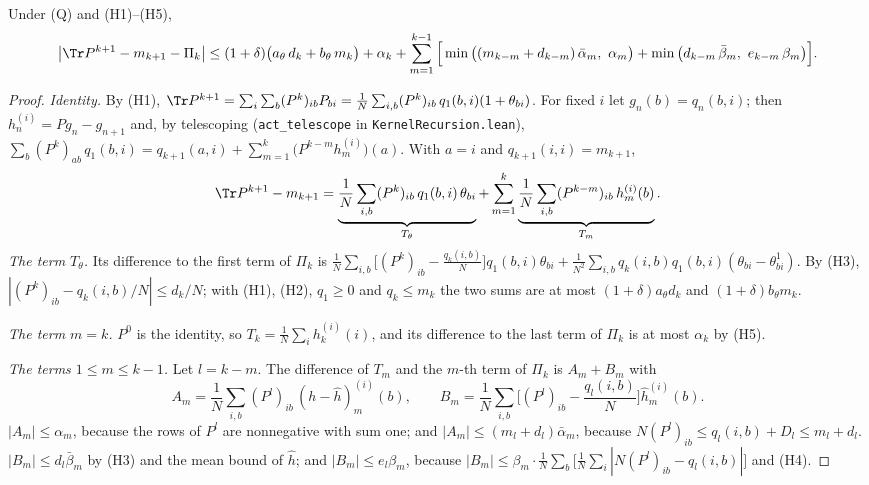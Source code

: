 \begin{lemma}\label{lem:reduction-abstract}
Under \textup{(Q)} and \textup{(H1)}--\textup{(H5)},
\[
 \big|\Tr P^{k+1}-m_{k+1}-\Pi_k\big|\le(1+\delta)\big(a_\theta\,d_k+b_\theta\,m_k\big)+\alpha_k
 +\sum_{m=1}^{k-1}\Big[\min\big((m_{k-m}+d_{k-m})\,\bar\alpha_m,\ \alpha_m\big)
 +\min\big(d_{k-m}\,\bar\beta_m,\ e_{k-m}\,\beta_m\big)\Big].
\]
\end{lemma}

\begin{proof}
\emph{Identity.} By (H1), $\Tr P^{k+1}=\sum_i\sum_b(P^k)_{ib}P_{bi}=\frac1N\sum_{i,b}(P^k)_{ib}\,q_1(b,i)(1+\theta_{bi})$.
For fixed $i$ let $g_n(b)=q_n(b,i)$; then $h^{(i)}_n=Pg_n-g_{n+1}$ and, by telescoping
(\texttt{act\_telescope} in \texttt{KernelRecursion.lean}),
$\sum_b(P^k)_{ab}\,q_1(b,i)=q_{k+1}(a,i)+\sum_{m=1}^k\big(P^{k-m}h^{(i)}_m\big)(a)$. With $a=i$ and
$q_{k+1}(i,i)=m_{k+1}$,
\[
 \Tr P^{k+1}-m_{k+1}=\underbrace{\frac1N\sum_{i,b}(P^k)_{ib}\,q_1(b,i)\,\theta_{bi}}_{T_\theta}
 +\sum_{m=1}^{k}\underbrace{\frac1N\sum_{i,b}(P^{k-m})_{ib}\,h^{(i)}_m(b)}_{T_m} .
\]
\emph{The term $T_\theta$.} Its difference to the first term of $\Pi_k$ is
$\frac1N\sum_{i,b}\big[(P^k)_{ib}-\frac{q_k(i,b)}N\big]q_1(b,i)\theta_{bi}+\frac1{N^2}\sum_{i,b}q_k(i,b)q_1(b,i)(\theta_{bi}-\theta^1_{bi})$.
By (H3), $|(P^k)_{ib}-q_k(i,b)/N|\le d_k/N$; with (H1), (H2), $q_1\ge0$ and $q_k\le m_k$ the two sums are at
most $(1+\delta)a_\theta d_k$ and $(1+\delta)b_\theta m_k$.

\emph{The term $m=k$.} $P^0$ is the identity, so $T_k=\frac1N\sum_ih^{(i)}_k(i)$, and its difference to
the last term of $\Pi_k$ is at most $\alpha_k$ by (H5).

\emph{The terms $1\le m\le k-1$.} Let $l=k-m$. The difference of $T_m$ and the $m$-th term of $\Pi_k$ is
$A_m+B_m$ with
\[
 A_m=\frac1N\sum_{i,b}(P^l)_{ib}\,(h-\hat h)^{(i)}_m(b),\qquad
 B_m=\frac1N\sum_{i,b}\Big[(P^l)_{ib}-\frac{q_l(i,b)}N\Big]\hat h^{(i)}_m(b).
\]
$|A_m|\le\alpha_m$, because the rows of $P^l$ are nonnegative with sum one; and
$|A_m|\le(m_l+d_l)\bar\alpha_m$, because $N(P^l)_{ib}\le q_l(i,b)+D_l\le m_l+d_l$. $|B_m|\le d_l\bar\beta_m$ by (H3)
and the mean bound of $\hat h$; and $|B_m|\le e_l\beta_m$, because
$|B_m|\le\beta_m\cdot\frac1N\sum_b\big[\frac1N\sum_i|N(P^l)_{ib}-q_l(i,b)|\big]$ and (H4).
\end{proof}

